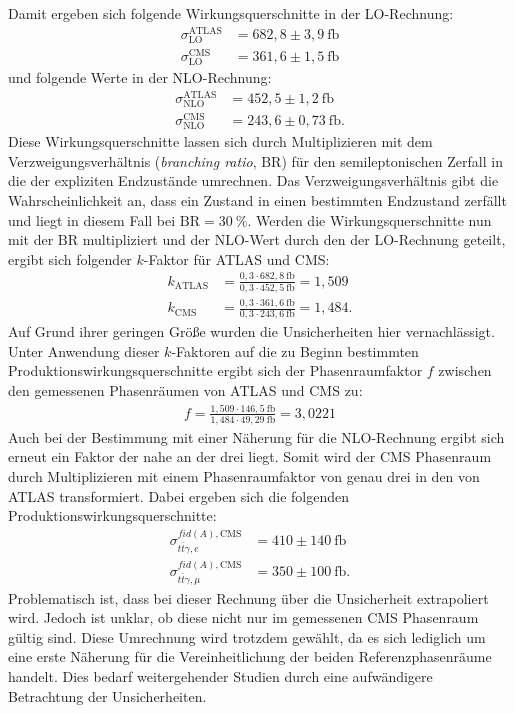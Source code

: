 Damit ergeben sich folgende Wirkungsquerschnitte in der LO-Rechnung:
\begin{align}
  \sigma^{\text{ATLAS}}_{\text{LO}} &= 682,8 \pm 3,9~ \si{\femto\barn}\\
  \sigma^{\text{CMS}}_{\text{LO}} &= 361,6 \pm 1,5~ \si{\femto\barn}
\end{align}
und folgende Werte in der NLO-Rechnung:
\begin{align}
  \sigma^{\text{ATLAS}}_{\text{NLO}} &= 452,5 \pm 1,2~ \si{\femto\barn}\\
  \sigma^{\text{CMS}}_{\text{NLO}} &= 243,6 \pm 0,73~ \si{\femto\barn}.
\end{align}
Diese Wirkungsquerschnitte lassen sich durch Multiplizieren mit dem Verzweigungsverhältnis (\textit{branching ratio}, $\mathrm{BR}$) für den semileptonischen Zerfall in die der expliziten Endzustände umrechnen.
Das Verzweigungsverhältnis gibt die Wahrscheinlichkeit an, dass ein Zustand in einen bestimmten Endzustand zerfällt und liegt in diesem Fall bei $\mathrm{BR}=\SI{30}{\percent}$. Werden die Wirkungsquerschnitte nun mit der $\mathrm{BR}$ multipliziert und der NLO-Wert durch den der LO-Rechnung geteilt, ergibt sich folgender $k$-Faktor für ATLAS und CMS:
\begin{align}
  k_{\text{ATLAS}} &= \frac{0,3 \cdot 682,8~ \si{\femto\barn}}{0,3 \cdot 452,5~ \si{\femto\barn}} = 1,509\\
  k_{\text{CMS}} &= \frac{0,3 \cdot 361,6~ \si{\femto\barn}}{0,3 \cdot 243,6~ \si{\femto\barn}} = 1,484.
\end{align}
Auf Grund ihrer geringen Größe wurden die Unsicherheiten hier vernachlässigt.
Unter Anwendung dieser $k$-Faktoren auf die zu Beginn bestimmten Produktionswirkungsquerschnitte ergibt sich der Phasenraumfaktor $f$ zwischen den gemessenen Phasenräumen von ATLAS und CMS zu:
\begin{align}
  f = \frac{1,509 \cdot 146,5~ \si{\femto\barn}}{1,484 \cdot 49,29~ \si{\femto\barn}} = 3,0221
\end{align}
Auch bei der Bestimmung mit einer Näherung für die NLO-Rechnung ergibt sich erneut ein Faktor der nahe an der drei liegt. Somit wird der CMS Phasenraum durch Multiplizieren mit einem Phasenraumfaktor von genau drei in den von ATLAS transformiert. Dabei ergeben sich die folgenden Produktionswirkungsquerschnitte:
\begin{align}
  \sigma^{fid(A), \text{CMS}}_{t\bar{t}\gamma, e} &= 410 \pm 140~ \si{\femto\barn}\\
  \sigma^{fid(A), \text{CMS}}_{t\bar{t}\gamma, \mu} &= 350 \pm 100~ \si{\femto\barn}.
\end{align}
Problematisch ist, dass bei dieser Rechnung über die Unsicherheit extrapoliert wird. Jedoch ist unklar, ob diese nicht nur im gemessenen CMS Phasenraum gültig sind. Diese Umrechnung wird trotzdem gewählt, da es sich lediglich um eine erste Näherung für die Vereinheitlichung der beiden Referenzphasenräume handelt. Dies bedarf weitergehender Studien durch eine aufwändigere Betrachtung der Unsicherheiten.
%
%

